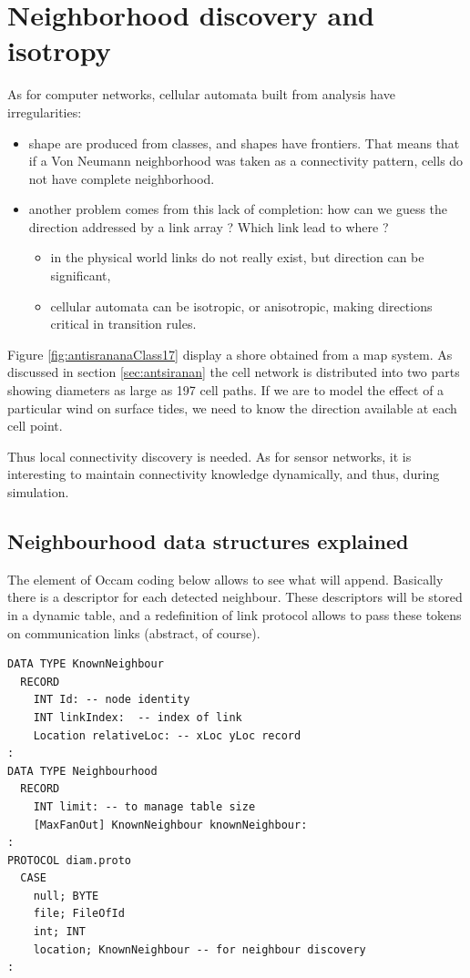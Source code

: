 \section{Neighborhood discovery and isotropy}

As for computer networks,  cellular automata built from analysis have irregularities:

\begin{itemize}
\item shape are  produced from classes, and shapes have frontiers. That means that
if a Von Neumann neighborhood was taken as a connectivity pattern, cells do not have
complete neighborhood.
\item another problem comes from this lack of completion: how can we guess the direction addressed
by a link array ? Which link lead to where ?
\begin{itemize}
\item in the physical world links do not really exist, but direction can be significant,
\item cellular automata can be isotropic, or anisotropic, making directions critical
in transition rules.
\end{itemize}
\end{itemize}




Figure \ref{fig:antisrananaClass17} display a shore obtained from a map system.
As discussed in section \ref{sec:antsiranan} the cell network is distributed into
two parts showing diameters as large as 197 cell paths. If we are to model the effect
of a particular wind on surface tides, we need to know the direction available at each
cell point.

Thus local connectivity discovery is needed. As for sensor networks, it is interesting
to maintain connectivity knowledge  dynamically, and thus, during simulation.

 \subsection {Neighbourhood data structures explained }

The element of Occam coding below allows to see what will append. Basically there
is a descriptor for each detected neighbour. These descriptors will be stored
in a dynamic table, and a redefinition of link protocol allows to pass these tokens
on communication links (abstract, of course).

\begin{lstlisting}  
DATA TYPE KnownNeighbour
  RECORD
    INT Id: -- node identity
    INT linkIndex:  -- index of link
    Location relativeLoc: -- xLoc yLoc record
:
DATA TYPE Neighbourhood
  RECORD
    INT limit: -- to manage table size
    [MaxFanOut] KnownNeighbour knownNeighbour:
:
PROTOCOL diam.proto
  CASE
    null; BYTE
    file; FileOfId
    int; INT
    location; KnownNeighbour -- for neighbour discovery
:
\end{lstlisting}



